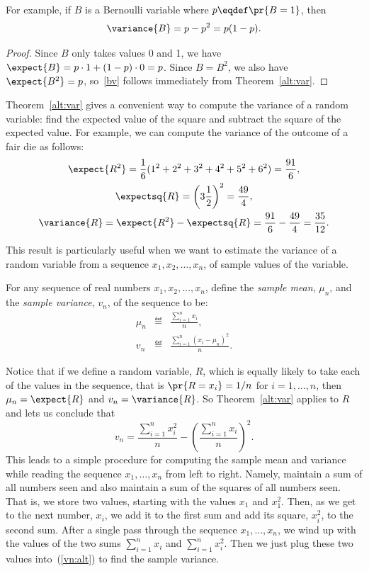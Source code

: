 For example, if $B$ is a Bernoulli variable where $p\eqdef \pr{B=1}$, then
\begin{equation}\label{bv}
\variance{B} = p-p^2 = p(1-p).
\end{equation}
\begin{proof}
Since $B$ only takes values 0 and 1, we have $\expect{B}=p\cdot 1 + (1-p)
\cdot 0 = p$.  Since $B = B^2$, we also have $\expect{B^2} = p$,
so~\eqref{bv} follows immediately from Theorem~\ref{alt:var}.
\end{proof}

\iffalse
\begin{optional}

Theorem~\ref{alt:var} gives a convenient way to compute the variance of a
random variable: find the expected value of the square and subtract the
square of the expected value.  For example, we can compute the variance of
the outcome of a fair die as follows:
\begin{gather*}
  \expect{R^2} = \frac{1}{6} (1^2 + 2^2 + 3^2 + 4^2 + 5^2 + 6^2) = \frac{91}{6}, \\
  \expectsq{R} = \left(3 \frac{1}{2}\right)^2 = \frac{49}{4}, \\
  \variance{R}  = \expect{R^2} - \expectsq{R}
  = \frac{91}{6} - \frac{49}{4} = \frac{35}{12}.
\end{gather*}

This result is particularly useful when we want to estimate the variance
of a random variable from a sequence $x_1,x_2,\dots,x_n$, of sample values
of the variable.

\begin{definition}
For any sequence of real numbers $x_1,x_2,\dots,x_n$, define the
\emph{sample mean}, $\mu_n$, and the \emph{sample variance}, $v_n$, of the
sequence to be:
\begin{eqnarray*}
\mu_n  & \eqdef & \frac{\sum_{i=1}^n x_i}{n},\\
v_n  & \eqdef & \frac{\sum_{i=1}^n (x_i - \mu_n)^2}{n}.
\end{eqnarray*}
\end{definition}
Notice that if we define a random variable, $R$, which is equally likely
to take each of the values in the sequence, that is $\pr{R = x_i} = 1/n$
for $i = 1,\dots,n$, then $\mu_n = \expect{R}$ and $v_n = \variance{R}$.
So Theorem~\ref{alt:var} applies to $R$ and lets us conclude that
\begin{equation}\label{vn:alt}
v_n = \frac{\sum_{i=1}^n x_i^2}{n} - \left(\frac{\sum_{i=1}^n x_i}{n}\right)^2.
\end{equation}
This leads to a simple procedure for computing the sample mean and
variance while reading the sequence $x_1,\dots,x_n$ from left to right.
Namely, maintain a sum of all numbers seen and also maintain a sum of the
squares of all numbers seen.  That is, we store two values, starting with
the values $x_1$ and $x_1^2$.  Then, as we get to the next number, $x_i$,
we add it to the first sum and add its square, $x_{i}^2$, to the second
sum.  After a single pass through the sequence $x_1,\dots,x_n$, we wind up
with the values of the two sums $\sum_{i=1}^n x_i$ and $\sum_{i=1}^n
x_i^2$.  Then we just plug these two values into~(\ref{vn:alt}) to find
the sample variance.


\end{optional}
